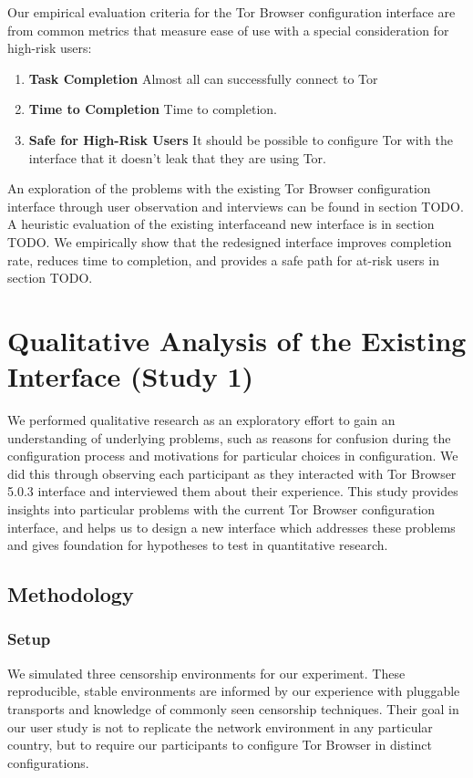 \documentclass{template}
\begin{document}
Our empirical evaluation criteria for the Tor Browser configuration
interface are from common metrics that measure ease of use with a special 
consideration for high-risk users: 
\begin{enumerate} \itemsep1pt \parskip0pt 
    \item {\bfseries Task Completion} Almost all can successfully connect to Tor
    \item {\bfseries Time to Completion} Time to completion. 
    \item {\bfseries Safe for High-Risk Users} It should be possible to configure Tor with the interface that it doesn't leak that they are using Tor. 
\end{enumerate}

An exploration of the problems with the existing Tor Browser 
configuration interface through user observation and interviews can be 
found in section {\color{red} TODO}. A heuristic evaluation of the existing interfaceand new interface is in section {\color{red} TODO}. We empirically show 
that the redesigned interface improves completion rate, reduces time to completion, 
and provides a safe path for at-risk users in section {\color{red} TODO}. 

\section{Qualitative Analysis of the Existing Interface (Study 1)}
We performed qualitative research as an exploratory effort to gain an 
understanding of underlying problems, such as reasons for confusion 
during the configuration process and motivations for particular choices in 
configuration. We did this through observing each participant as they 
interacted with Tor Browser 5.0.3 interface and interviewed them about
their experience. This study provides insights into particular problems with 
the current Tor Browser configuration interface, and helps us to design
a new interface which addresses these problems and gives foundation
for hypotheses to test in quantitative research. 

\subsection{Methodology} 
\subsubsection{Setup}
\label{sec:setup}
We simulated three censorship environments for our experiment.
These reproducible, stable environments are informed by our experience 
with pluggable transports and knowledge of commonly seen censorship 
techniques. Their goal in our user study is not to replicate the network 
environment in any particular country, but to require our participants to 
configure Tor Browser in distinct configurations. 
\end{document}
